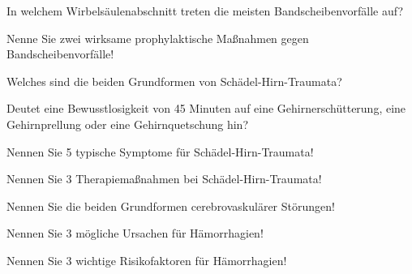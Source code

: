 \documentclass[10pt, a4paper]{exam}
\begin{document}
\begin{questions}
\begin{solution}
  \end{solution}

  \question In welchem Wirbelsäulenabschnitt treten die meisten Bandscheibenvorfälle auf?
  \begin{solution}

  \end{solution}

  \question Nenne Sie zwei wirksame prophylaktische Maßnahmen gegen Bandscheibenvorfälle!
  \begin{solution}

  \end{solution}

  \question Welches sind die beiden Grundformen von Schädel-Hirn-Traumata?
  \begin{solution}

  \end{solution}

  \question Deutet eine Bewusstlosigkeit von 45 Minuten auf eine Gehirnerschütterung, eine Gehirnprellung oder eine Gehirnquetschung hin?
  \begin{solution}

  \end{solution}

  \question Nennen Sie 5 typische Symptome für Schädel-Hirn-Traumata!
  \begin{solution}

  \end{solution}

  \question Nennen Sie 3 Therapiemaßnahmen bei Schädel-Hirn-Traumata!
  \begin{solution}

  \end{solution}

  \question Nennen Sie die beiden Grundformen cerebrovaskulärer Störungen!
  \begin{solution}

  \end{solution}

  \question Nennen Sie 3 mögliche Ursachen für Hämorrhagien!
  \begin{solution}

  \end{solution}

  \question Nennen Sie 3 wichtige Risikofaktoren für Hämorrhagien!
  \begin{solution}

  \end{solution}


\end{questions}
\end{document}

